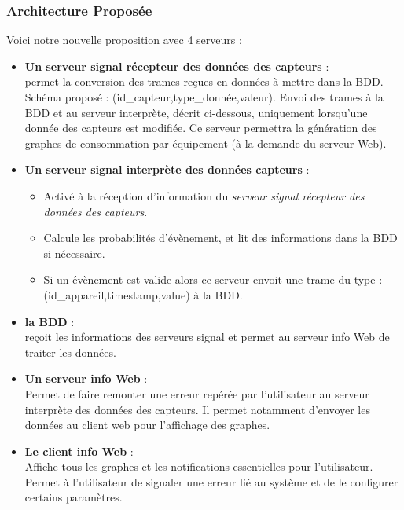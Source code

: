 \documentclass[10pt,a4paper]{article}
\begin{document}
\subsubsection{Architecture Proposée}
Voici notre nouvelle proposition avec 4 serveurs :
\begin{itemize}
  \item \textbf{Un serveur signal récepteur des données des capteurs} :\\
  permet la conversion des trames reçues en données à mettre dans la BDD. Schéma proposé : (id\_capteur,type\_donnée,valeur). Envoi des trames à la BDD et au serveur interprète, décrit ci-dessous, uniquement lorsqu'une donnée des capteurs est modifiée. Ce serveur permettra la génération des graphes de consommation par équipement (à la demande du serveur Web).
  \item \textbf{Un serveur signal interprète des données capteurs} :
  \begin{itemize}
    \item Activé à la réception d'information du \textit{serveur signal récepteur des données des capteurs}.
    \item Calcule les probabilités d'évènement, et lit des informations dans la BDD si nécessaire.
    \item Si un évènement est valide alors ce serveur envoit une trame du type : (id\_appareil,timestamp,value) à la BDD.
  \end{itemize}
  \item \textbf{la BDD} : \\
  reçoit les informations des serveurs signal et permet au serveur info Web de traiter les données.
  \item \textbf{Un serveur info Web} :\\
  Permet de faire remonter une erreur repérée par l'utilisateur au serveur interprète des données des capteurs. Il permet notamment d'envoyer les données au client web pour l'affichage des graphes.
  \item \textbf{Le client info Web} :\\
  Affiche tous les graphes et les notifications essentielles pour l'utilisateur. Permet à l'utilisateur de signaler une erreur lié au système et de le configurer certains paramètres.
\end{itemize}
\end{document}
